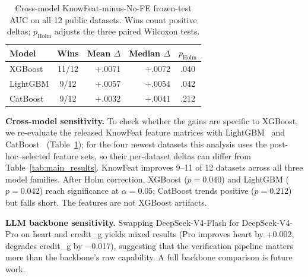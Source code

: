 \begin{table}[t]
\centering
\caption{Cross-model KnowFeat-minus-No-FE frozen-test AUC on all 12 public datasets. Wins count positive deltas; $p_{\mathrm{Holm}}$ adjusts the three paired Wilcoxon tests.}
\label{tab:cross_model}
\small
\setlength{\tabcolsep}{4pt}
\begin{tabular}{l c r r c}
\hline
\textbf{Model} & \textbf{Wins} & \textbf{Mean $\Delta$} & \textbf{Median $\Delta$} & \textbf{$p_{\mathrm{Holm}}$} \\
\hline
XGBoost  & 11/12 & +.0071 & +.0072 & .040 \\
LightGBM & 9/12 & +.0057 & +.0054 & .042 \\
CatBoost & 9/12 & +.0032 & +.0041 & .212 \\
\hline
\end{tabular}
\end{table}

\textbf{Cross-model sensitivity.} To check whether the gains are specific to XGBoost, we re-evaluate the released KnowFeat feature matrices with LightGBM~\cite{ke2017lightgbm} and CatBoost~\cite{prokhorenkova2018catboost} (Table~\ref{tab:cross_model}); for the four newest datasets this analysis uses the post-hoc--selected feature sets, so their per-dataset deltas can differ from Table~\ref{tab:main_results}. KnowFeat improves 9--11 of 12 datasets across all three model families. After Holm correction, XGBoost (\(p{=}0.040\)) and LightGBM (\(p{=}0.042\)) reach significance at \(\alpha{=}0.05\); CatBoost trends positive (\(p{=}0.212\)) but falls short. The features are not XGBoost artifacts.

\textbf{LLM backbone sensitivity.}
Swapping DeepSeek-V4-Flash for DeepSeek-V4-Pro on heart and credit\_g yields mixed results (Pro improves heart by +0.002, degrades credit\_g by $-$0.017), suggesting that the verification pipeline matters more than the backbone's raw capability. A full backbone comparison is future work.

